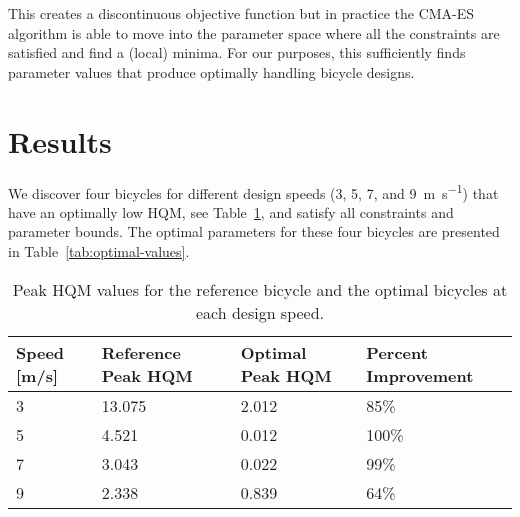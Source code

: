 \documentclass{bmd2019a}
\begin{document}
This creates a discontinuous objective function but in practice the CMA-ES
algorithm is able to move into the parameter space where all the constraints
are satisfied and find a (local) minima. For our purposes, this sufficiently
finds parameter values that produce optimally handling bicycle designs.

\section{Results}
%
We discover four bicycles for different design speeds (3, 5, 7, and
9~\si{\meter\per\second}) that have an optimally low HQM, see
Table~\ref{tab:hqm}, and satisfy all constraints and parameter bounds. The
optimal parameters for these four bicycles are presented in
Table~\ref{tab:optimal-values}.
%
\begin{table}
  \caption{Peak HQM values for the reference bicycle and the optimal bicycles
    at each design speed.}
  \label{tab:hqm}
  \centering
  \begin{tabular}{llll}
    \toprule
    Speed [m/s] & Reference Peak HQM & Optimal Peak HQM & Percent Improvement \\
    \midrule
    3 & 13.075 & 2.012 & 85\% \\
    5 & 4.521  & 0.012 & 100\% \\
    7 & 3.043  & 0.022 & 99\% \\
    9 & 2.338  & 0.839 & 64\% \\
    \bottomrule
  \end{tabular}
\end{table}
%
\end{document}
